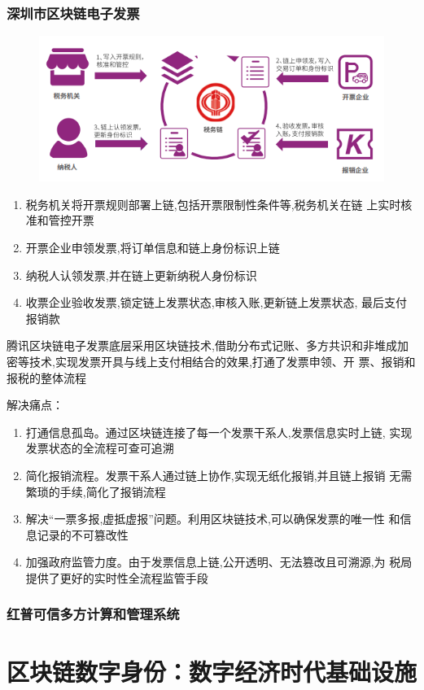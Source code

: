 \documentclass[11pt]{beamer}
\begin{document}
\begin{frame}[allowframebreaks]
	\frametitle{深圳市区块链电子发票}
	\begin{figure}
		\centering
		\includegraphics[width=0.6\linewidth]{figures/gov/8}
		\label{fig:8}
	\end{figure}	
{\footnotesize 	\begin{enumerate}
		\item 税务机关将开票规则部署上链,包括开票限制性条件等,税务机关在链
		上实时核准和管控开票
		\item 开票企业申领发票,将订单信息和链上身份标识上链
		\item 纳税人认领发票,并在链上更新纳税人身份标识
		\item 收票企业验收发票,锁定链上发票状态,审核入账,更新链上发票状态,
		最后支付报销款
	\end{enumerate}}
{\footnotesize 	腾讯区块链电子发票底层采用区块链技术,借助分布式记账、多方共识和非堆成加密等技术,实现发票开具与线上支付相结合的效果,打通了发票申领、开
	票、报销和报税的整体流程}

解决痛点：
\begin{enumerate}
	\item 打通信息孤岛。通过区块链连接了每一个发票干系人,发票信息实时上链,
	实现发票状态的全流程可查可追溯
	\item 简化报销流程。发票干系人通过链上协作,实现无纸化报销,并且链上报销
	无需繁琐的手续,简化了报销流程
	\item 解决“一票多报,虚抵虚报”问题。利用区块链技术,可以确保发票的唯一性
	和信息记录的不可篡改性
	\item 加强政府监管力度。由于发票信息上链,公开透明、无法篡改且可溯源,为
	税局提供了更好的实时性全流程监管手段
\end{enumerate}
\end{frame}

\begin{frame}
	\frametitle{红普可信多方计算和管理系统}
\end{frame}

\section{区块链数字身份：数字经济时代基础设施}
\end{document}
